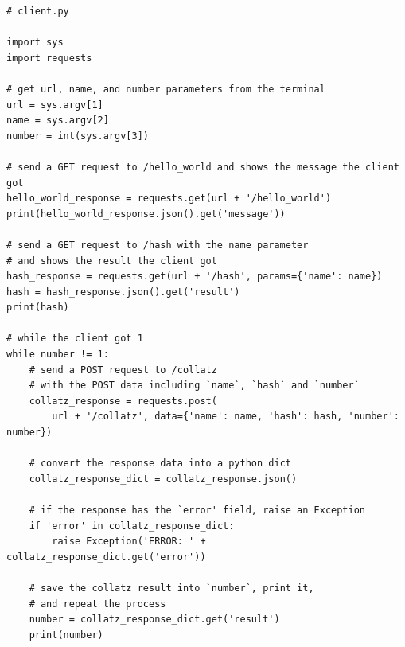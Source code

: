 \documentclass{homework}
\begin{document}
\begin{verbatim}
# client.py

import sys
import requests

# get url, name, and number parameters from the terminal
url = sys.argv[1]
name = sys.argv[2]
number = int(sys.argv[3])

# send a GET request to /hello_world and shows the message the client got
hello_world_response = requests.get(url + '/hello_world')
print(hello_world_response.json().get('message'))

# send a GET request to /hash with the name parameter
# and shows the result the client got
hash_response = requests.get(url + '/hash', params={'name': name})
hash = hash_response.json().get('result')
print(hash)

# while the client got 1
while number != 1:
    # send a POST request to /collatz
    # with the POST data including `name`, `hash` and `number`
    collatz_response = requests.post(
        url + '/collatz', data={'name': name, 'hash': hash, 'number': number})
    
    # convert the response data into a python dict
    collatz_response_dict = collatz_response.json()

    # if the response has the `error' field, raise an Exception
    if 'error' in collatz_response_dict:
        raise Exception('ERROR: ' + collatz_response_dict.get('error'))

    # save the collatz result into `number`, print it,
    # and repeat the process
    number = collatz_response_dict.get('result')
    print(number)

\end{verbatim}
\end{document}

